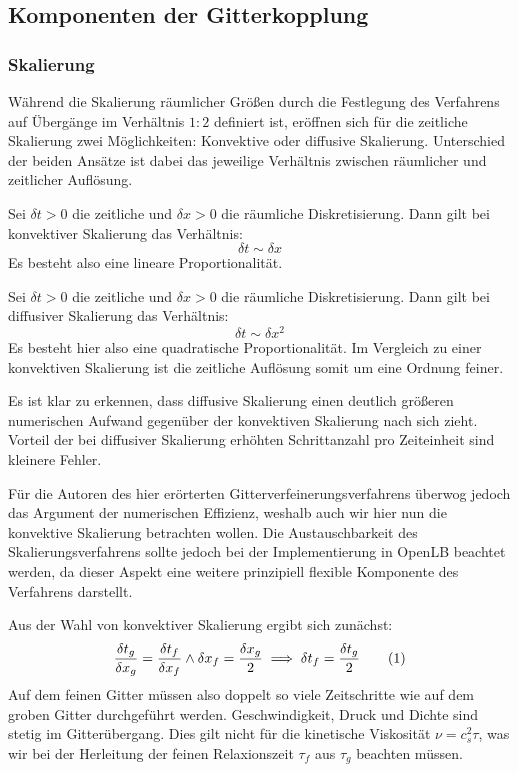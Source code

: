 \newpage
\subsection{Komponenten der Gitterkopplung}
\subsubsection{Skalierung}
\label{kap:Skalierung}

Während die Skalierung räumlicher Größen durch die Festlegung des Verfahrens auf Übergänge im Verhältnis \(1:2\) definiert ist, eröffnen sich für die zeitliche Skalierung zwei Möglichkeiten: Konvektive oder diffusive Skalierung. Unterschied der beiden Ansätze ist dabei das jeweilige Verhältnis zwischen räumlicher und zeitlicher Auflösung.

\begin{Definition}
Sei \(\delta t > 0\) die zeitliche und \(\delta x > 0\) die räumliche Diskretisierung. Dann gilt bei konvektiver Skalierung das Verhältnis:
\[ \delta t \sim \delta x \]
Es besteht also eine lineare Proportionalität.
\end{Definition}

\begin{Definition}
Sei \(\delta t > 0\) die zeitliche und \(\delta x > 0\) die räumliche Diskretisierung. Dann gilt bei diffusiver Skalierung das Verhältnis:
\[ \delta t \sim \delta x^2 \]
Es besteht hier also eine quadratische Proportionalität. Im Vergleich zu einer konvektiven Skalierung ist die zeitliche Auflösung somit um eine Ordnung feiner.
\end{Definition}

Es ist klar zu erkennen, dass diffusive Skalierung einen deutlich größeren numerischen Aufwand gegenüber der konvektiven Skalierung nach sich zieht. Vorteil der bei diffusiver Skalierung erhöhten Schrittanzahl pro Zeiteinheit sind kleinere Fehler.

Für die Autoren des hier erörterten Gitterverfeinerungsverfahrens überwog jedoch das Argument der numerischen Effizienz, weshalb auch wir hier nun die konvektive Skalierung betrachten wollen. Die Austauschbarkeit des Skalierungsverfahrens sollte jedoch bei der Implementierung in OpenLB beachtet werden, da dieser Aspekt eine weitere prinzipiell flexible Komponente des Verfahrens darstellt.

\bigskip

Aus der Wahl von konvektiver Skalierung ergibt sich zunächst:
\[\frac{\delta t_g}{\delta x_g} = \frac{\delta t_f}{\delta x_f} \land \delta x_f = \frac{\delta x_g}{2} \implies \delta t_f = \frac{\delta t_g}{2} \numberthis\label{eq:gridTime}\]
Auf dem feinen Gitter müssen also doppelt so viele Zeitschritte wie auf dem groben Gitter durchgeführt werden. Geschwindigkeit, Druck und Dichte sind stetig im Gitterübergang. Dies gilt nicht für die kinetische Viskosität \(\nu = c_s^2 \tau\), was wir bei der Herleitung der feinen Relaxionszeit \(\tau_f\) aus \(\tau_g\) beachten müssen.

